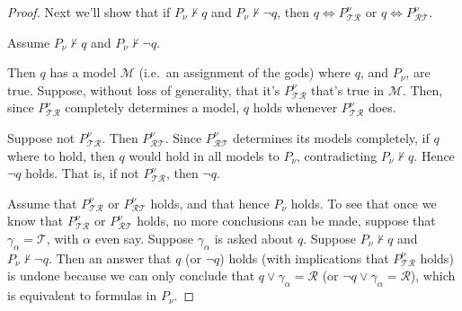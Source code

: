 \documentclass[twoside,twocolumn,a4paper,11pt]{article}
\theoremstyle{definition}
\begin{document}
\begin{proof}

%


Next we'll show that if 
$P_\nu\!\nvdash q$ and 
$P_\nu\!\nvdash \neg q$,
then 
\(q \Leftrightarrow
  P_{\mathcal{\scriptscriptstyle T}\mathcal{\scriptscriptstyle R}}^\nu \)
or
\(q \Leftrightarrow
  P_{\mathcal{\scriptscriptstyle R}\mathcal{\scriptscriptstyle T}}^\nu \).

Assume 
$P_\nu\!\nvdash q$ and 
$P_\nu\!\nvdash \neg q$.

Then $q$ has a model $\mathcal{M}$ (i.e.\ an assignment of the gods)
where $q$, and $P_\nu$, are true. Suppose, without loss of generality, that it's 
$P_{\mathcal{\scriptscriptstyle T}\mathcal{\scriptscriptstyle R}}^\nu$
that's true in $\mathcal{M}$.
Then, since $P_{\mathcal{\scriptscriptstyle T}\mathcal{\scriptscriptstyle R}}^\nu$
completely determines a model, $q$ holds whenever 
$P_{\mathcal{\scriptscriptstyle T}\mathcal{\scriptscriptstyle R}}^\nu$ does.

Suppose not
$P_{\mathcal{\scriptscriptstyle T}\mathcal{\scriptscriptstyle R}}^\nu$.
Then 
$P_{\mathcal{\scriptscriptstyle R}\mathcal{\scriptscriptstyle T}}^\nu$.
Since 
$P_{\mathcal{\scriptscriptstyle R}\mathcal{\scriptscriptstyle T}}^\nu$
determines its models completely, if $q$ where to hold, then $q$ would
hold in all models to $P_\nu$, contradicting
$P_\nu\!\nvdash q$.
Hence $\neg q$ holds. That is, 
if not
$P_{\mathcal{\scriptscriptstyle T}\mathcal{\scriptscriptstyle R}}^\nu$,
then $\neg q$.


Assume that 
$P_{\mathcal{\scriptscriptstyle T}\mathcal{\scriptscriptstyle R}}^\nu$ or
$P_{\mathcal{\scriptscriptstyle R}\mathcal{\scriptscriptstyle T}}^\nu$ holds,
and that hence $P_\nu$ holds.
To see that once we know that
$P_{\mathcal{\scriptscriptstyle T}\mathcal{\scriptscriptstyle R}}^\nu$ or
$P_{\mathcal{\scriptscriptstyle R}\mathcal{\scriptscriptstyle T}}^\nu$ holds,
no more conclusions can be made, 
suppose that $\gamma_{\alpha}\!=\!\mathcal{T}$, with $\alpha$ even say.
Suppose $\gamma_\alpha$ is asked about $q$.
Suppose
$P_\nu\!\nvdash q$ and 
$P_\nu\!\nvdash \neg q$.
Then an answer that $q$ (or $\neg q$) holds 
(with implications that 
$P_{\mathcal{\scriptscriptstyle T}\mathcal{\scriptscriptstyle R}}^\nu$ holds)
is undone because we can only conclude that
$q \vee \gamma_{\alpha}\!=\!\mathcal{R}$ (or 
$\neg q \vee \gamma_{\alpha}\!=\!\mathcal{R}$),
which is equivalent to 
formulas in $P_\nu$.



\end{proof}
\end{document}
